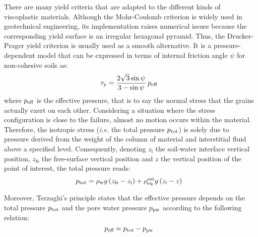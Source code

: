 \documentclass{../GPUSPHtemplate}
\begin{document}
There are many yield criteria that are adapted to the different kinds of viscoplastic materials. Although the Mohr-Coulomb criterion is widely used in geotechnical engineering, its implementation raises numerical issues because the corresponding yield surface is an irregular hexagonal pyramid. Thus, the Drucker-Prager yield criterion is usually used as a smooth alternative. It is a pressure-dependent model that can be expressed in terms of internal friction angle $\psi$ for non-cohesive soils as:
\begin{equation}
\tau_{\text{y}} = \dfrac{2 \sqrt{3} \sin \psi }{3 - \sin \psi } \: p_{\text{eff}}
\label{eq:DPyieldStress}
\end{equation}
%
where $p_{\text{eff}}$ is the effective pressure, that is to say the normal stress that the grains actually exert on each other. Considering a situation where the stress configuration is close to the failure, almost no motion occurs within the material. Therefore, the isotropic stress (\textit{i.e.} the total pressure $p_{\text{tot}}$) is solely due to pressure derived from the weight of the column of material and interstitial fluid above a specified level. Consequently, denoting $z_{\text{i}}$ the soil-water interface vertical position, $z_{\text{fs}}$ the free-surface vertical position and $z$ the vertical position of the point of interest, the total pressure reads:
 \begin{equation}
p_{\text{tot}} = \rho_{\text{w}} g \left( z_{\text{fs}} -  z_{\text{i}} \right) + \rho_{\text{eq}}^{\text{sat}} g \left( z_{\text{i}} - z \right)
\label{eq:totalPressure}
 \end{equation}

Moreover, Terzaghi's principle \citep{terzaghi1936shearing} states that the effective pressure depends on the total pressure $p_{\text{tot}}$ and the pore water pressure $p_{\text{pw}}$ according to the following relation:
%
\begin{equation}
p_{\text{eff}} = p_{\text{tot}} - p_{\text{pw}}
\label{eq:terzaghiRelation}
\end{equation}
%
\end{document}
